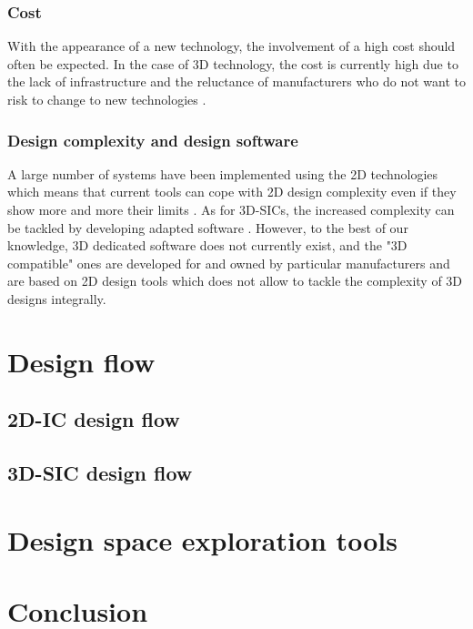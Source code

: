 \subsubsection{Cost}
With the appearance of a new technology, the involvement of a high cost should often be expected. In the case of 3D technology, the cost is currently high due to the lack of infrastructure and the reluctance of manufacturers who do not want to risk to change to new technologies \cite{659500}.

\subsubsection{Design complexity and design software}
A large number of systems have been implemented using the 2D technologies which means that current tools can cope with 2D design complexity even if they show more and more their limits \cite{vanderbiest06, PFF10}. As for 3D-SICs, the increased complexity can be tackled by developing adapted software \cite{659500}. However, to the best of our knowledge, 3D dedicated software does not currently exist, and the "3D compatible" ones are developed for and owned by particular manufacturers and are based on 2D design tools which does not allow to tackle the complexity of 3D designs integrally.

\section{Design flow}

\subsection{2D-IC design flow}

\subsection{3D-SIC design flow}

\section{Design space exploration tools}

\section{Conclusion}